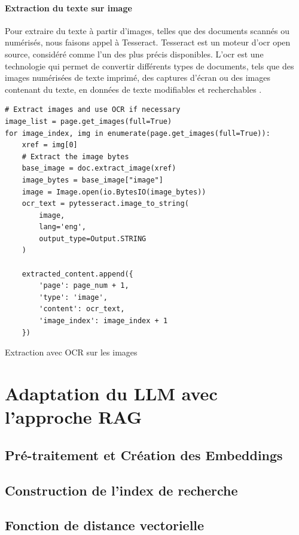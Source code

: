 \paragraph{Extraction du texte sur image} \hspace{0pt}

Pour extraire du texte à partir d'images, telles que des documents scannés ou numérisés, nous faisons appel à Tesseract. Tesseract est un moteur d'\ac{ocr} open source, considéré comme l'un des plus précis disponibles. L'\ac{ocr} est une technologie qui permet de convertir différents types de documents, tels que des images numérisées de texte imprimé, des captures d'écran ou des images contenant du texte, en données de texte modifiables et recherchables \cite{smith_tesseract_2007}.

\begin{listing}[!ht]
\begin{verbatim}
# Extract images and use OCR if necessary
image_list = page.get_images(full=True)
for image_index, img in enumerate(page.get_images(full=True)):
    xref = img[0]
    # Extract the image bytes
    base_image = doc.extract_image(xref)
    image_bytes = base_image["image"]
    image = Image.open(io.BytesIO(image_bytes))
    ocr_text = pytesseract.image_to_string(
        image, 
        lang='eng',
        output_type=Output.STRING
    )
    
    extracted_content.append({
        'page': page_num + 1, 
        'type': 'image', 
        'content': ocr_text, 
        'image_index': image_index + 1
    })
\end{verbatim}
\caption{Extraction avec OCR sur les images}
\label{appendix:code:python:text-extract-}
\end{listing}

\section{Adaptation du LLM avec l'approche RAG}
\subsection{Pré-traitement et Création des Embeddings}
\subsection{Construction de l'index de recherche}
\subsection{Fonction de distance vectorielle}
